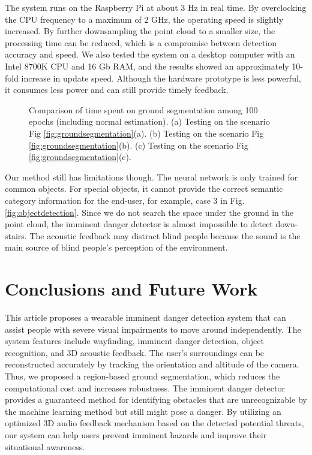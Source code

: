 \documentclass{ieeeaccess}
\begin{document}
The system runs on the Raspberry Pi at about 3 Hz in real time. By overclocking the CPU frequency to a maximum of 2 GHz, the operating speed is slightly increased. By further downsampling the point cloud to a smaller size, the processing time can be reduced, which is a compromise between detection accuracy and speed. We also tested the system on a desktop computer with an Intel 8700K CPU and 16 Gb RAM, and the results showed an approximately 10-fold increase in update speed. Although the hardware prototype is less powerful, it consumes less power and can still provide timely feedback.
\begin{figure}[t]
    \centering
    \caption{Comparison of time spent on ground segmentation among 100 epochs (including normal estimation). (a) Testing on the scenario Fig \ref{fig:groundsegmentation}(a). (b) Testing on the scenario Fig \ref{fig:groundsegmentation}(b). (c) Testing on the scenario Fig \ref{fig:groundsegmentation}(c).}%
    \label{fig:comparison}
\end{figure}

Our method still has limitations though. The neural network is only trained for common objects. For special objects, it cannot provide the correct semantic category information for the end-user, for example, case 3 in Fig. \ref{fig:objectdetection}. Since we do not search the space under the ground in the point cloud, the imminent danger detector is almost impossible to detect down-stairs. The acoustic feedback may distract blind people because the sound is the main source of blind people's perception of the environment.


\section{Conclusions and Future Work} \label{section:conclusion}
This article proposes a wearable imminent danger detection system that can assist people with severe visual impairments to move around independently. The system features include wayfinding, imminent danger detection, object recognition, and 3D acoustic feedback. The user's surroundings can be reconstructed accurately by tracking the orientation and altitude of the camera. Thus, we proposed a region-based ground segmentation, which reduces the computational cost and increases robustness. The imminent danger detector provides a guaranteed method for identifying obstacles that are unrecognizable by the machine learning method but still might pose a danger. By utilizing an optimized 3D audio feedback mechanism based on the detected potential threats, our system can help users prevent imminent hazards and improve their situational awareness.
\end{document}
